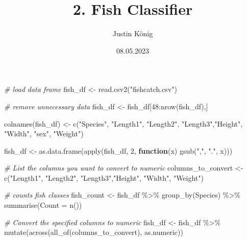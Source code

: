 \documentclass[
]{article}
\title{2. Fish Classifier}
\author{Justin König}
\date{08.05.2023}
\newenvironment{Shaded}{\begin{snugshade}}{\end{snugshade}}
\newcommand{\AttributeTok}[1]{\textcolor[rgb]{0.77,0.63,0.00}{#1}}
\newcommand{\CommentTok}[1]{\textcolor[rgb]{0.56,0.35,0.01}{\textit{#1}}}
\newcommand{\ControlFlowTok}[1]{\textcolor[rgb]{0.13,0.29,0.53}{\textbf{#1}}}
\newcommand{\DecValTok}[1]{\textcolor[rgb]{0.00,0.00,0.81}{#1}}
\newcommand{\FunctionTok}[1]{\textcolor[rgb]{0.00,0.00,0.00}{#1}}
\newcommand{\NormalTok}[1]{#1}
\newcommand{\OtherTok}[1]{\textcolor[rgb]{0.56,0.35,0.01}{#1}}
\newcommand{\SpecialCharTok}[1]{\textcolor[rgb]{0.00,0.00,0.00}{#1}}
\newcommand{\StringTok}[1]{\textcolor[rgb]{0.31,0.60,0.02}{#1}}
\begin{document}
\maketitle

{
\setcounter{tocdepth}{2}
\tableofcontents
}
\begin{Shaded}
\begin{Highlighting}[]
\CommentTok{\# load data frame}
\NormalTok{fish\_df }\OtherTok{\textless{}{-}} \FunctionTok{read.csv2}\NormalTok{(}\StringTok{"fishcatch.csv"}\NormalTok{)}

\CommentTok{\# remove unnecessary data}
\NormalTok{fish\_df }\OtherTok{\textless{}{-}}\NormalTok{ fish\_df[}\DecValTok{48}\SpecialCharTok{:}\FunctionTok{nrow}\NormalTok{(fish\_df),]}

\FunctionTok{colnames}\NormalTok{(fish\_df) }\OtherTok{\textless{}{-}} \FunctionTok{c}\NormalTok{(}\StringTok{"Species"}\NormalTok{, }\StringTok{"Length1"}\NormalTok{, }\StringTok{"Length2"}\NormalTok{, }\StringTok{"Length3"}\NormalTok{,}\StringTok{"Height"}\NormalTok{, }\StringTok{"Width"}\NormalTok{,}
                       \StringTok{"sex"}\NormalTok{, }\StringTok{"Weight"}\NormalTok{)}

\NormalTok{fish\_df }\OtherTok{\textless{}{-}} \FunctionTok{as.data.frame}\NormalTok{(}\FunctionTok{apply}\NormalTok{(fish\_df, }\DecValTok{2}\NormalTok{, }\ControlFlowTok{function}\NormalTok{(x) }\FunctionTok{gsub}\NormalTok{(}\StringTok{","}\NormalTok{, }\StringTok{"."}\NormalTok{, x)))}

\CommentTok{\# List the columns you want to convert to numeric}
\NormalTok{columns\_to\_convert }\OtherTok{\textless{}{-}} \FunctionTok{c}\NormalTok{(}\StringTok{"Length1"}\NormalTok{, }\StringTok{"Length2"}\NormalTok{, }\StringTok{"Length3"}\NormalTok{,}\StringTok{"Height"}\NormalTok{, }\StringTok{"Width"}\NormalTok{,}
                       \StringTok{"Weight"}\NormalTok{)}

\CommentTok{\# counts fish classes}
\NormalTok{fish\_count }\OtherTok{\textless{}{-}}\NormalTok{ fish\_df }\SpecialCharTok{\%\textgreater{}\%}
  \FunctionTok{group\_by}\NormalTok{(Species) }\SpecialCharTok{\%\textgreater{}\%}
  \FunctionTok{summarise}\NormalTok{(}\AttributeTok{Count =} \FunctionTok{n}\NormalTok{())}

\CommentTok{\# Convert the specified columns to numeric}
\NormalTok{fish\_df }\OtherTok{\textless{}{-}}\NormalTok{ fish\_df }\SpecialCharTok{\%\textgreater{}\%}
  \FunctionTok{mutate}\NormalTok{(}\FunctionTok{across}\NormalTok{(}\FunctionTok{all\_of}\NormalTok{(columns\_to\_convert), as.numeric))}



\end{Highlighting}
\end{Shaded}
\end{document}
